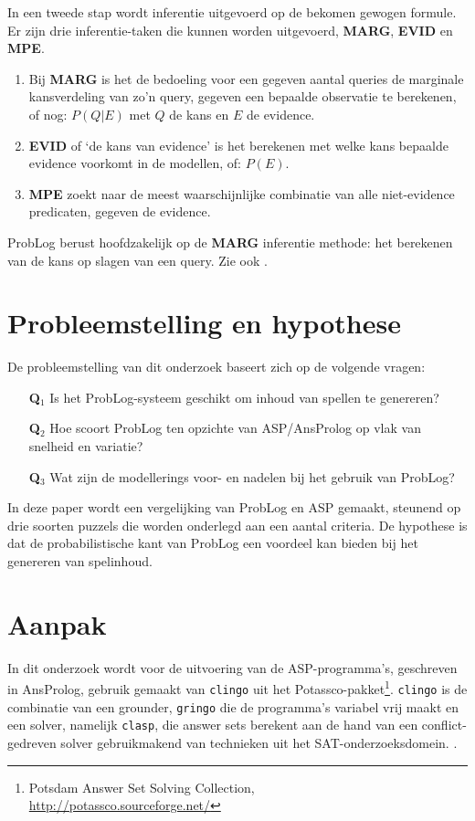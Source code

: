\documentclass{article}
\begin{document}
In een tweede stap wordt inferentie uitgevoerd op de bekomen gewogen formule. Er zijn drie inferentie-taken die kunnen worden uitgevoerd, \textbf{MARG}, \textbf{EVID} en \textbf{MPE}.
\begin{enumerate}
\item Bij \textbf{MARG} is het de bedoeling voor een gegeven aantal queries de marginale kansverdeling van zo'n query, gegeven een bepaalde observatie te berekenen, of nog: $P(Q | E)$ met $Q$ de kans en $E$ de evidence.
\item \textbf{EVID} of `de kans van evidence' is het berekenen met welke kans bepaalde evidence voorkomt in de modellen, of: $P(E)$.
\item \textbf{MPE} zoekt naar de meest waarschijnlijke combinatie van alle niet-evidence predicaten, gegeven de evidence.
\end{enumerate}
ProbLog berust hoofdzakelijk op de \textbf{MARG} inferentie methode: het berekenen van de kans op slagen van een query. Zie ook \cite{FierensTPLP15}.

\section{Probleemstelling en hypothese}
De probleemstelling van dit onderzoek baseert zich op de volgende vragen:
\begin{itemize}[leftmargin=6mm]
\item[\textbf{Q$_1$}] Is het ProbLog-systeem geschikt om inhoud van spellen te genereren? 
\item[\textbf{Q$_2$}] Hoe scoort ProbLog ten opzichte van ASP/AnsProlog op vlak van snelheid en variatie?
\item[\textbf{Q$_3$}] Wat zijn de modellerings voor- en nadelen bij het gebruik van ProbLog? 
\end{itemize}

In deze paper wordt een vergelijking van ProbLog en ASP gemaakt, steunend op drie soorten puzzels die worden onderlegd aan een aantal criteria. De hypothese is dat de probabilistische kant van ProbLog een voordeel kan bieden bij het genereren van spelinhoud.
 
\section{Aanpak}
In dit onderzoek wordt voor de uitvoering van de ASP-programma's, geschreven in AnsProlog, gebruik gemaakt van  \texttt{clingo} uit het Potassco-pakket\footnote{Potsdam Answer Set Solving Collection, \\\url{http://potassco.sourceforge.net/}}. \texttt{clingo} is de combinatie van een grounder, \texttt{gringo} die de programma's variabel vrij maakt en een solver, namelijk \texttt{clasp}, die answer sets berekent \cite{clingo} aan de hand van een conflict-gedreven solver gebruikmakend van technieken uit het SAT-onderzoeksdomein. \cite{Gebser12conflict-drivenanswer}. 
\end{document}
